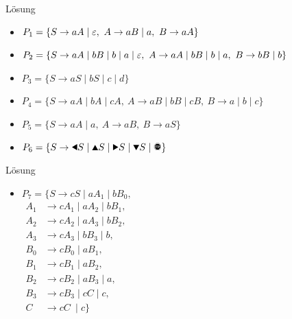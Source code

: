 {
\begin{frame}{Lösung}
    \begin{itemize}
        \item<1-> \alert<1>{$P_1 = \{S \to aA \mid \varepsilon,\ A \to aB \mid a,\ B \to aA\}$}
        \item<2-> \alert<2>{$P_2 = \{S \to aA \mid bB \mid b \mid a \mid \varepsilon,\ A \to aA \mid bB \mid b \mid a ,\ B \to bB \mid b\}$}
        \item<3-> \alert<3>{$P_3 = \{S \to aS \mid bS \mid c \mid d\}$}
        \item<4-> \alert<4>{$P_4 = \{S \to aA \mid bA \mid cA,\ A \to aB \mid bB \mid cB,\ B \to a \mid b \mid c\}$}
        \item<5-> \alert<5>{$P_5 = \{S \to aA \mid a,\ A \to aB,\ B \to aS\}$}
        \item<6-> \alert<6>{$P_6 = \{S \to \text{\Rewind}S \mid \text{\MoveUp}S \mid \text{\Forward}S \mid \text{\MoveDown}S \mid \text{\Stopsign}\}$}
    \end{itemize}
\end{frame}
}

{
\begin{frame}{Lösung}
        \begin{itemize}
            \item 
                \alert<1>{
                $P_7 = \{S \to cS \mid aA_1 \mid bB_0,$\\
                \vspace*{0.9mm}
                \hspace*{7mm}
                $\begin{aligned}
                A_1 &\to cA_1 \mid aA_2 \mid bB_1,\\
                A_2 &\to cA_2 \mid aA_3 \mid bB_2,\\
                A_3 &\to cA_3 \mid bB_3 \mid b,\\
                B_0 &\to cB_0 \mid aB_1,\\
                B_1 &\to cB_1 \mid aB_2,\\
                B_2 &\to cB_2 \mid aB_3 \mid a,\\
                B_3 &\to cB_3 \mid cC \mid c,\\
                C_{\;} &\to cC_{\;}\mid c\}
                \end{aligned}
                $}
        \end{itemize}
\end{frame}
}

